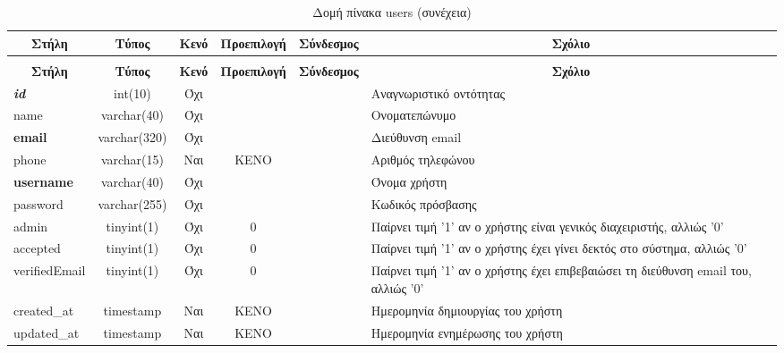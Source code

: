 %
%
\begin{longtable}{|l|c|c|c|l|p{4.5cm}|}
	\caption{Δομή πίνακα users} \label{tab:users-structure} \\
	\hline \multicolumn{1}{|c|}{\textbf{Στήλη}} & \multicolumn{1}{|c|}{\textbf{Τύπος}} & \multicolumn{1}{|c|}{\textbf{Κενό}} & \multicolumn{1}{|c|}{\textbf{Προεπιλογή}} & \multicolumn{1}{|c|}{\textbf{Σύνδεσμος}} & \multicolumn{1}{|c|}{\textbf{Σχόλιο}} \\ \hline \hline \endfirsthead
	\caption[{}]{Δομή πίνακα users (συνέχεια)} \\
	\hline \multicolumn{1}{|c|}{\textbf{Στήλη}} & \multicolumn{1}{|c|}{\textbf{Τύπος}} & \multicolumn{1}{|c|}{\textbf{Κενό}} & \multicolumn{1}{|c|}{\textbf{Προεπιλογή}} & \multicolumn{1}{|c|}{\textbf{Σύνδεσμος}} & \multicolumn{1}{|c|}{\textbf{Σχόλιο}} \\ \hline \hline \endhead \endfoot
	\textbf{\textit{id}} & int(10) & Όχι &  &  & Αναγνωριστικό οντότητας \\ \hline
	name & varchar(40) & Όχι &  &  & Ονοματεπώνυμο \\ \hline
	\textbf{email} & varchar(320) & Όχι &  &  & Διεύθυνση email\\ \hline
	phone & varchar(15) & Ναι & ΚΕΝΟ &  & Αριθμός τηλεφώνου \\ \hline
	\textbf{username} & varchar(40) & Όχι &  &  & Όνομα χρήστη \\ \hline
	password & varchar(255) & Όχι &  &  & Κωδικός πρόσβασης \\ \hline
	admin & tinyint(1) & Όχι & 0 &  & Παίρνει τιμή '1' αν ο χρήστης είναι γενικός διαχειριστής, αλλιώς '0' \\ \hline
	accepted & tinyint(1) & Όχι & 0 &  & Παίρνει τιμή '1' αν ο χρήστης έχει γίνει δεκτός στο σύστημα, αλλιώς '0' \\ \hline
	verifiedEmail & tinyint(1) & Όχι & 0 &  & Παίρνει τιμή '1' αν ο χρήστης έχει επιβεβαιώσει τη διεύθυνση email του, αλλιώς '0' \\ \hline
	created\_at & timestamp & Ναι & ΚΕΝΟ &  & Ημερομηνία δημιουργίας του χρήστη \\ \hline
	updated\_at & timestamp & Ναι & ΚΕΝΟ &  & Ημερομηνία ενημέρωσης του χρήστη \\ \hline
\end{longtable}

